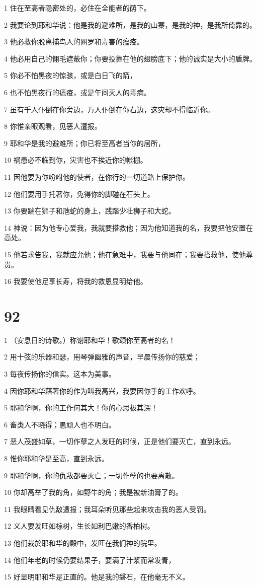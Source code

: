 \par 1 住在至高者隐密处的，必住在全能者的荫下。
\par 2 我要论到耶和华说：他是我的避难所，是我的山寨，是我的神，是我所倚靠的。
\par 3 他必救你脱离捕鸟人的网罗和毒害的瘟疫。
\par 4 他必用自己的翎毛遮蔽你；你要投靠在他的翅膀底下；他的诚实是大小的盾牌。
\par 5 你必不怕黑夜的惊骇，或是白日飞的箭，
\par 6 也不怕黑夜行的瘟疫，或是午间灭人的毒病。
\par 7 虽有千人仆倒在你旁边，万人仆倒在你右边，这灾却不得临近你。
\par 8 你惟亲眼观看，见恶人遭报。
\par 9 耶和华是我的避难所；你已将至高者当你的居所，
\par 10 祸患必不临到你，灾害也不挨近你的帐棚。
\par 11 因他要为你吩咐他的使者，在你行的一切道路上保护你。
\par 12 他们要用手托著你，免得你的脚碰在石头上。
\par 13 你要踹在狮子和虺蛇的身上，践踏少壮狮子和大蛇。
\par 14 神说：因为他专心爱我，我就要搭救他；因为他知道我的名，我要把他安置在高处。
\par 15 他若求告我，我就应允他；他在急难中，我要与他同在；我要搭救他，使他尊贵。
\par 16 我要使他足享长寿，将我的救恩显明给他。

\chapter{92}

\par 1 （安息日的诗歌。）称谢耶和华！歌颂你至高者的名！
\par 2 用十弦的乐器和瑟，用琴弹幽雅的声音，早晨传扬你的慈爱；
\par 3 每夜传扬你的信实。这本为美事。
\par 4 因你耶和华藉著你的作为叫我高兴，我要因你手的工作欢呼。
\par 5 耶和华啊，你的工作何其大！你的心思极其深！
\par 6 畜类人不晓得；愚顽人也不明白。
\par 7 恶人茂盛如草，一切作孽之人发旺的时候，正是他们要灭亡，直到永远。
\par 8 惟你耶和华是至高，直到永远。
\par 9 耶和华啊，你的仇敌都要灭亡；一切作孽的也要离散。
\par 10 你却高举了我的角，如野牛的角；我是被新油膏了的。
\par 11 我眼睛看见仇敌遭报；我耳朵听见那些起来攻击我的恶人受罚。
\par 12 义人要发旺如棕树，生长如利巴嫩的香柏树。
\par 13 他们栽於耶和华的殿中，发旺在我们神的院里。
\par 14 他们年老的时候仍要结果子，要满了汁浆而常发青，
\par 15 好显明耶和华是正直的。他是我的磐石，在他毫无不义。

